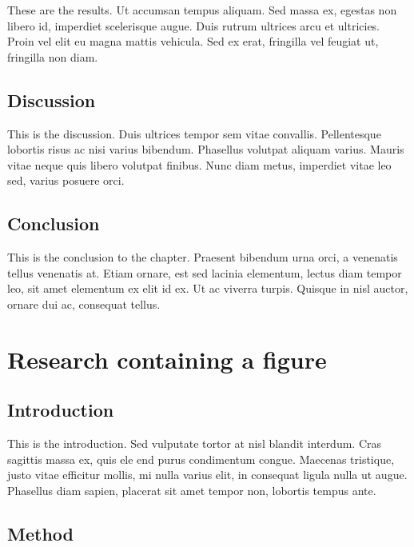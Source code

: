 \documentclass[12pt,turkish,a4paperpaper,]{report}
\begin{document}
These are the results. Ut accumsan tempus aliquam. Sed massa ex, egestas
non libero id, imperdiet scelerisque augue. Duis rutrum ultrices arcu et
ultricies. Proin vel elit eu magna mattis vehicula. Sed ex erat,
fringilla vel feugiat ut, fringilla non diam.

\hypertarget{discussion}{%
\section{Discussion}\label{discussion}}

This is the discussion. Duis ultrices tempor sem vitae convallis.
Pellentesque lobortis risus ac nisi varius bibendum. Phasellus volutpat
aliquam varius. Mauris vitae neque quis libero volutpat finibus. Nunc
diam metus, imperdiet vitae leo sed, varius posuere orci.

\hypertarget{conclusion-1}{%
\section{Conclusion}\label{conclusion-1}}

This is the conclusion to the chapter. Praesent bibendum urna orci, a
venenatis tellus venenatis at. Etiam ornare, est sed lacinia elementum,
lectus diam tempor leo, sit amet elementum ex elit id ex. Ut ac viverra
turpis. Quisque in nisl auctor, ornare dui ac, consequat tellus.

\hypertarget{research-containing-a-figure}{%
\chapter{Research containing a
figure}\label{research-containing-a-figure}}

\thispagestyle{empty}

\hypertarget{introduction-2}{%
\section{Introduction}\label{introduction-2}}

This is the introduction. Sed vulputate tortor at nisl blandit interdum.
Cras sagittis massa ex, quis ele end purus condimentum congue. Maecenas
tristique, justo vitae efficitur mollis, mi nulla varius elit, in
consequat ligula nulla ut augue. Phasellus diam sapien, placerat sit
amet tempor non, lobortis tempus ante.

\hypertarget{method-1}{%
\section{Method}\label{method-1}}
\end{document}
